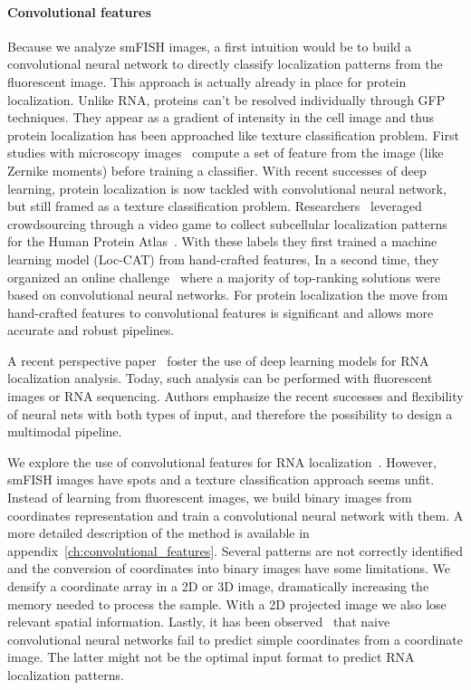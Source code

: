 \paragraph{Convolutional features}

Because we analyze \ac{smFISH} images, a first intuition would be to build a convolutional neural network to directly classify localization patterns from the fluorescent image.
This approach is actually already in place for protein localization.
Unlike \ac{RNA}, proteins can't be resolved individually through \ac{GFP} techniques.
They appear as a gradient of intensity in the cell image and thus protein localization has been approached like texture classification problem.
First studies with microscopy images~\cite{boland_automated_1998} compute a set of feature from the image  (like Zernike moments) before training a classifier.
With recent successes of deep learning, protein localization is now tackled with convolutional neural network, but still framed as a texture classification problem.
Researchers~\cite{sullivan_deep_2018} leveraged crowdsourcing through a video game to collect subcellular localization patterns for the Human Protein Atlas~\cite{Uhlen_2015}.
With these labels they first trained a machine learning model (Loc-CAT) from hand-crafted features,
In a second time, they organized an online challenge~\cite{ouyang_analysis_2019} where a majority of top-ranking solutions were based on convolutional neural networks.
For protein localization the move from hand-crafted features to convolutional features is significant and allows more accurate and robust pipelines.

A recent perspective paper~\cite{Savulescu_2021} foster the use of deep learning models for \ac{RNA} localization analysis.
Today, such analysis can be performed with fluorescent images or \ac{RNA} sequencing.
Authors emphasize the recent successes and flexibility of neural nets with both types of input, and therefore the possibility to design a multimodal pipeline.

We explore the use of convolutional features for \ac{RNA} localization~\cite{dubois_deep_2019}.
However, \ac{smFISH} images have spots and a texture classification approach seems unfit.
Instead of learning from fluorescent images, we build binary images from coordinates representation and train a convolutional neural network with them.
A more detailed description of the method is available in appendix~\ref{ch:convolutional_features}.
Several patterns are not correctly identified and the conversion of coordinates into binary images have some limitations.
We densify a coordinate array in a 2D or 3D image, dramatically increasing the memory needed to process the sample.
With a 2D projected image we also lose relevant spatial information.
Lastly, it has been observed~\cite{Rosanne_2018} that naive convolutional neural networks fail to predict simple coordinates from a coordinate image.
The latter might not be the optimal input format to predict \ac{RNA} localization patterns.

